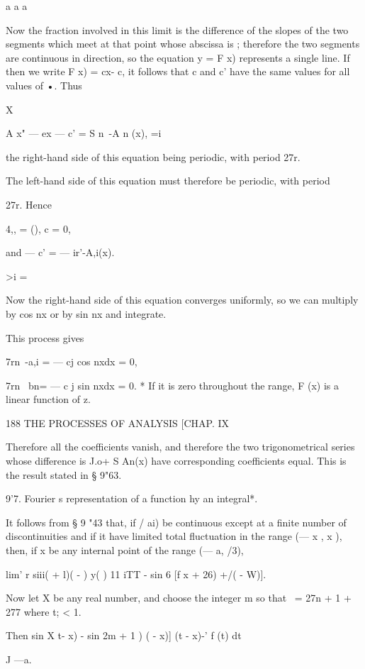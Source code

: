 {a a a 

Now the fraction involved in this limit is the difference of the slopes of 
the two segments which meet at that point whose abscissa is   ; therefore the 
two segments are continuous in direction, so the equation y = F x) represents 
a single line. If then we write F x) = cx- c, it follows that c and c' have 
the same values for all values of  •. Thus 

X 

 A x" — ex — c' = S n~-A n (x), 
 =i 

the right-hand side of this equation being periodic, with period 27r. 

The left-hand side of this equation must therefore be periodic, with period 

27r. Hence 

 4,, = (), c = 0, 

and — c' = — ir'-A,i(x). 

>i = \ 

Now the right-hand side of this equation converges uniformly, so we can 
multiply by cos nx or by sin nx and integrate. 

This process gives 

7rn~-a,i = — cj cos nxdx = 0, 

7rn~ bn= — c j sin nxdx = 0. 
* If it is zero throughout the range, F (x) is a linear function of z. 



188 THE PROCESSES OF ANALYSIS [CHAP. IX 

Therefore all the coefficients vanish, and therefore the two trigonometrical 
series whose difference is J.o+ S An(x) have corresponding coefficients equal. 
This is the result stated in § 9"63. 

9'7. Fourier s representation of a function hy an integral*. 

It follows from § 9 "43 that, if /  ai) be continuous except at a finite 
number of discontinuities and if it have limited total fluctuation in the 
range (— x , x ), then, if x be any internal point of the range (— a, /3), 

lim' r siii(   + l)( - ) y( )    11  iTT - sin 6 [f x + 26) +/(  - W)]. 

Now let X be any real number, and choose the integer m so that 
\ = 27n + 1 + 277 where   t; < 1. 

Then  sin X t- x) - sin  2m + 1 ) (  - x)] (t - x)-' f (t) dt 

J —a. 

}
